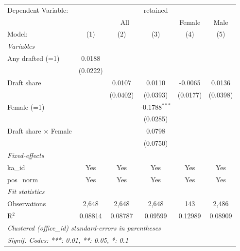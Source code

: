\begingroup
\centering
\begin{tabular}{lccccc}
   \tabularnewline \midrule \midrule
   Dependent Variable: & \multicolumn{5}{c}{retained}\\
    & \multicolumn{3}{c}{All} & Female & Male \\ 
   Model:                       & (1)      & (2)      & (3)             & (4)      & (5)\\  
   \midrule
   \emph{Variables}\\
   Any drafted (=1)             & 0.0188   &          &                 &          &   \\   
                                & (0.0222) &          &                 &          &   \\   
   Draft share                  &          & 0.0107   & 0.0110          & -0.0065  & 0.0136\\   
                                &          & (0.0402) & (0.0393)        & (0.0177) & (0.0398)\\   
   Female (=1)                  &          &          & -0.1788$^{***}$ &          &   \\   
                                &          &          & (0.0285)        &          &   \\   
   Draft share $\times$ Female  &          &          & 0.0798          &          &   \\   
                                &          &          & (0.0750)        &          &   \\   
   \midrule
   \emph{Fixed-effects}\\
   ka\_id                       & Yes      & Yes      & Yes             & Yes      & Yes\\  
   pos\_norm                    & Yes      & Yes      & Yes             & Yes      & Yes\\  
   \midrule
   \emph{Fit statistics}\\
   Observations                 & 2,648    & 2,648    & 2,648           & 143      & 2,486\\  
   R$^2$                        & 0.08814  & 0.08787  & 0.09599         & 0.12989  & 0.08909\\  
   \midrule \midrule
   \multicolumn{6}{l}{\emph{Clustered (office\_id) standard-errors in parentheses}}\\
   \multicolumn{6}{l}{\emph{Signif. Codes: ***: 0.01, **: 0.05, *: 0.1}}\\
\end{tabular}
\par\endgroup

